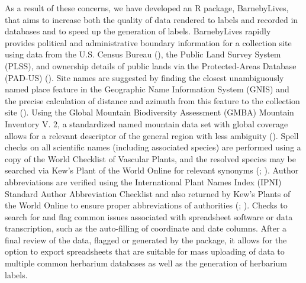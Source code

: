 \documentclass[
]{article}
\begin{document}
As a result of these concerns, we have developed an R package,
BarnebyLives, that aims to increase both the quality of data rendered to
labels and recorded in databases and to speed up the generation of
labels. BarnebyLives rapidly provides political and administrative
boundary information for a collection site using data from the U.S.
Census Bureau (), the
Public Land Survey System (PLSS), and ownership details of public lands
via the Protected-Areas Database (PAD-US)
(). Site
names are suggested by finding the closest unambiguously named place
feature in the Geographic Name Information System (GNIS) and the precise
calculation of distance and azimuth from this feature to the collection
site (). Using the Global Mountain
Biodiversity Assessment (GMBA) Mountain Inventory V. 2, a standardized
named mountain data set with global coverage allows for a relevant
descriptor of the general region with less ambiguity
().
Spell checks on all scientific names (including associated species) are
performed using a copy of the World Checklist of Vascular Plants, and
the resolved species may be searched via Kew's Plant of the World Online
for relevant synonyms (; ). Author abbreviations are
verified using the International Plant Names Index (IPNI) Standard
Author Abbreviation Checklist and also returned by Kew's Plants of the
World Online to ensure proper abbreviations of authorities
(;
). Checks to search for and flag
common issues associated with spreadsheet software or data
transcription, such as the auto-filling of coordinate and date columns.
After a final review of the data, flagged or generated by the package,
it allows for the option to export spreadsheets that are suitable for
mass uploading of data to multiple common herbarium databases as well as
the generation of herbarium labels.
\end{document}
